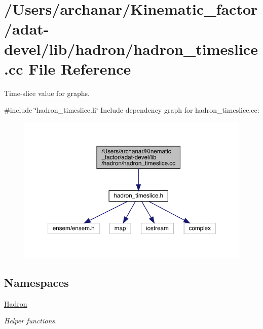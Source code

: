 \hypertarget{adat-devel_2lib_2hadron_2hadron__timeslice_8cc}{}\section{/\+Users/archanar/\+Kinematic\+\_\+factor/adat-\/devel/lib/hadron/hadron\+\_\+timeslice.cc File Reference}
\label{adat-devel_2lib_2hadron_2hadron__timeslice_8cc}


Time-\/slice value for graphs.  


{\ttfamily \#include \char`\"{}hadron\+\_\+timeslice.\+h\char`\"{}}\newline
Include dependency graph for hadron\+\_\+timeslice.\+cc\+:
\nopagebreak
\begin{figure}[H]
\begin{center}
\leavevmode
\includegraphics[width=350pt]{d1/d56/adat-devel_2lib_2hadron_2hadron__timeslice_8cc__incl}
\end{center}
\end{figure}
\subsection*{Namespaces}
\begin{DoxyCompactItemize}
\item 
 \mbox{\hyperlink{namespaceHadron}{Hadron}}
\begin{DoxyCompactList}\small\item\em Helper functions. \end{DoxyCompactList}\end{DoxyCompactItemize}
